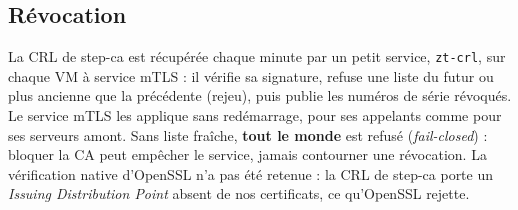 \documentclass[11pt,a4paper]{article}
\newcommand{\cmd}[1]{\texttt{#1}}
\begin{document}
\subsection{Révocation}
La CRL de step-ca est récupérée chaque minute par un petit service, \cmd{zt-crl}, sur chaque VM à
service mTLS : il vérifie sa signature, refuse une liste du futur ou plus ancienne que la précédente
(rejeu), puis publie les numéros de série révoqués. Le service mTLS les applique sans redémarrage,
pour ses appelants comme pour ses serveurs amont. Sans liste fraîche, \textbf{tout le monde} est
refusé (\emph{fail-closed}) : bloquer la CA peut empêcher le service, jamais contourner une révocation.
La vérification native d'OpenSSL n'a pas été retenue : la CRL de step-ca porte un \emph{Issuing
Distribution Point} absent de nos certificats, ce qu'OpenSSL rejette.

\end{document}
